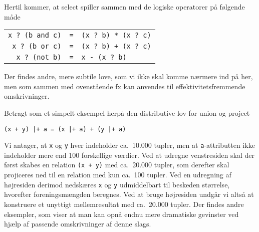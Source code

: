 Hertil kommer, at select spiller sammen med de logiske operatorer
p\aa{} f\o{}lgende m\aa{}de
\begin{center}
\begin{tabular}{rcl}
\verb"x ? (b and c)" & \verb"=" & \verb"(x ? b) * (x ? c)"\\
\verb"x ? (b or c)" & \verb"=" & \verb"(x ? b) + (x ? c)"\\
\verb"x ? (not b)" & \verb"=" & \verb"x - (x ? b)"
\end{tabular}
\end{center}
Der findes andre, mere subtile love, som vi ikke skal komme n\ae{}rmere
ind p\aa{} her, men som sammen med ovenst\aa{}ende fx kan anvendes til
effektivitetsfremmende omskrivninger.

Betragt som et simpelt eksempel herp\aa{} den distributive lov for
union og project
\begin{center}
\verb"(x + y) |+ a = (x |+ a) + (y |+ a)"
\end{center}
Vi antager, at \verb"x" og \verb"y" hver indeholder ca.\ 10.000 tupler,
men at \verb"a"-attribut\-ten ikke indeholder mere end 100 forskellige
v\ae{}rdier. Ved at udregne venstresiden skal der f\o{}rst skabes en
relation \verb"(x + y)" med ca.\ 20.000 tupler, som derefter
skal projiceres ned til en relation med kun ca.\ 100 tupler.
Ved en udregning af h\o{}jresiden derimod nedsk\ae{}res \verb"x" og
\verb"y" udmiddelbart til beskeden st\o{}rrelse, hvorefter
foreningsm\ae{}ngden beregnes. Ved at bruge h\o{}jresiden undg\aa{}r
vi alts\aa{} at konstruere et unyttigt mellemresultat med ca.\
20.000 tupler. Der findes andre eksempler, som viser at man kan opn\aa{}
endnu mere dramatiske gevinster ved hj\ae{}lp af passende omskrivninger
af denne slags.

